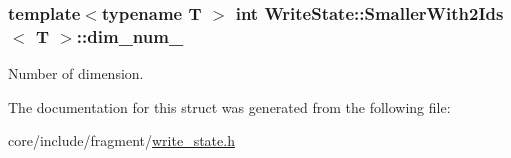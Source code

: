 \subsubsection[{dim\+\_\+num\+\_\+}]{\setlength{\rightskip}{0pt plus 5cm}template$<$typename T $>$ int {\bf Write\+State\+::\+Smaller\+With2\+Ids}$<$ T $>$\+::dim\+\_\+num\+\_\+}\label{structWriteState_1_1SmallerWith2Ids_aa3b69aafe98f420cbf57abf88fce2a78}
Number of dimension. 

The documentation for this struct was generated from the following file\+:\begin{DoxyCompactItemize}
\item 
core/include/fragment/\hyperlink{write__state_8h}{write\+\_\+state.\+h}\end{DoxyCompactItemize}
